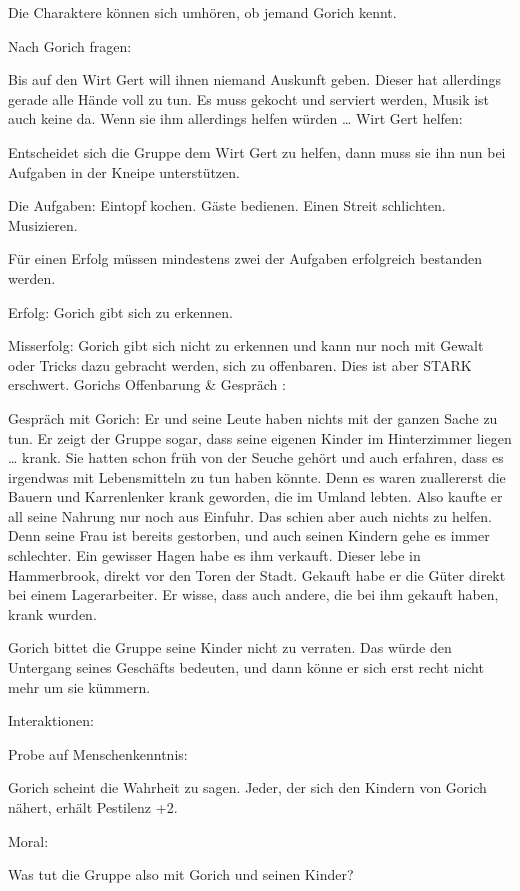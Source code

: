 Die Charaktere können sich umhören, ob jemand Gorich kennt.

Nach Gorich fragen:

Bis auf den Wirt Gert will ihnen niemand Auskunft geben.
Dieser hat allerdings gerade alle Hände voll zu tun.
Es muss gekocht und serviert werden, Musik ist auch keine da. Wenn sie ihm allerdings helfen würden …
Wirt Gert helfen:

Entscheidet sich die Gruppe dem Wirt Gert zu helfen, dann muss sie ihn nun bei Aufgaben in der Kneipe unterstützen.

Die Aufgaben:
Eintopf kochen.
Gäste bedienen.
Einen Streit schlichten.
Musizieren.

Für einen Erfolg müssen mindestens zwei der Aufgaben erfolgreich bestanden werden.

Erfolg:
Gorich gibt sich zu erkennen.

Misserfolg:
Gorich gibt sich nicht zu erkennen und kann nur noch mit Gewalt oder Tricks dazu gebracht werden, sich zu offenbaren. Dies ist aber STARK erschwert.
Gorichs Offenbarung \& Gespräch
:

Gespräch mit Gorich: Er und seine Leute haben nichts mit der ganzen Sache zu tun. Er zeigt der Gruppe sogar, dass seine eigenen Kinder im Hinterzimmer liegen … krank. Sie hatten schon früh von der Seuche gehört und auch erfahren, dass es irgendwas mit Lebensmitteln zu tun haben könnte. Denn es waren zuallererst die Bauern und Karrenlenker krank geworden, die im Umland lebten. Also kaufte er all seine Nahrung nur noch aus Einfuhr. Das schien aber auch nichts zu helfen. Denn seine Frau ist bereits gestorben, und auch seinen Kindern gehe es immer schlechter. Ein gewisser Hagen habe es ihm verkauft. Dieser lebe in Hammerbrook, direkt vor den Toren der Stadt. Gekauft habe er die Güter direkt bei einem Lagerarbeiter. Er wisse, dass auch andere, die bei ihm gekauft haben, krank wurden.

Gorich bittet die Gruppe seine Kinder nicht zu verraten. Das würde den Untergang seines Geschäfts bedeuten, und dann könne er sich erst recht nicht mehr um sie kümmern.

Interaktionen:

Probe auf Menschenkenntnis:

Gorich scheint die Wahrheit zu sagen.
Jeder, der sich den Kindern von Gorich nähert, erhält Pestilenz +2.

Moral:

Was tut die Gruppe also mit Gorich und seinen Kinder?


